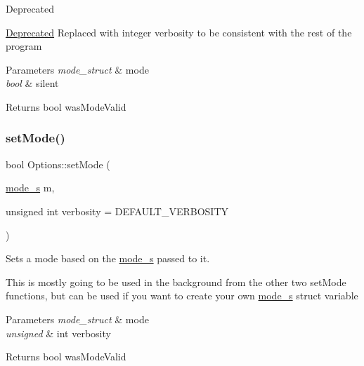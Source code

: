 \begin{DoxyRefDesc}{Deprecated}
\item[\mbox{\hyperlink{deprecated__deprecated000002}{Deprecated}}]Replaced with integer verbosity to be consistent with the rest of the program\end{DoxyRefDesc}



\begin{DoxyParams}{Parameters}
{\em mode\+\_\+struct} & mode \\
\hline
{\em bool} & silent\\
\hline
\end{DoxyParams}
\begin{DoxyReturn}{Returns}
bool was\+Mode\+Valid 
\end{DoxyReturn}
\mbox{\label{classOptions_a29a9b31540b8ef3f66c1c03a6db3b253}} 
\subsubsection{\texorpdfstring{setMode()}{setMode()}\hspace{0.1cm}{\footnotesize\ttfamily [6/6]}}
{\footnotesize\ttfamily bool Options\+::set\+Mode (\begin{DoxyParamCaption}\item[{\mbox{\hyperlink{structmode__s}{mode\+\_\+s}}}]{m,  }\item[{unsigned int}]{verbosity = {\ttfamily DEFAULT\+\_\+VERBOSITY} }\end{DoxyParamCaption})}



Sets a mode based on the \mbox{\hyperlink{structmode__s}{mode\+\_\+s}} passed to it. 

This is mostly going to be used in the background from the other two set\+Mode functions, but can be used if you want to create your own \mbox{\hyperlink{structmode__s}{mode\+\_\+s}} struct variable


\begin{DoxyParams}{Parameters}
{\em mode\+\_\+struct} & mode \\
\hline
{\em unsigned} & int verbosity\\
\hline
\end{DoxyParams}
\begin{DoxyReturn}{Returns}
bool was\+Mode\+Valid 
\end{DoxyReturn}
\mbox{\label{classOptions_a4352296c6a84486f5d96a2b6afe45040}} 

